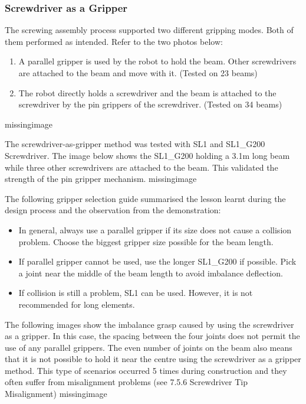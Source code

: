 \subsubsection{Screwdriver as a Gripper}
\label{subsubsection:exploration_4_screwdriver_as_a_gripper}

The screwing assembly process supported two different gripping modes. Both of them performed as intended. Refer to the two photos below:
\begin{enumerate}
    \item A parallel gripper is used by the robot to hold the beam. Other screwdrivers are attached to the beam and move with it. (Tested on 23 beams)
    \item The robot directly holds a screwdriver and the beam is attached to the screwdriver by the pin grippers of the screwdriver.  (Tested on 34 beams)
\end{enumerate}
missingimage

The screwdriver-as-gripper method was tested with SL1 and SL1\_G200 Screwdriver. The image below shows the SL1\_G200 holding a 3.1m long beam while three other screwdrivers are attached to the beam. This validated the strength of the pin gripper mechanism.
missingimage

The following gripper selection guide summarised the lesson learnt during the design process and the observation from the demonstration:
\begin{itemize}
    \item In general, always use a parallel gripper if its size does not cause a collision problem. Choose the biggest gripper size possible for the beam length.
    \item If parallel gripper cannot be used, use the longer SL1\_G200 if possible. Pick a joint near the middle of the beam length to avoid imbalance deflection.
    \item If collision is still a problem, SL1 can be used. However, it is not recommended for long elements.
\end{itemize}
The following images show the imbalance grasp caused by using the screwdriver as a gripper. In this case, the spacing between the four joints does not permit the use of any parallel grippers. The even number of joints on the beam also means that it is not possible to hold it near the centre using the screwdriver as a gripper method. This type of scenarios occurred 5 times during construction and they often suffer from misalignment problems (see 7.5.6 Screwdriver Tip Misalignment)
missingimage

